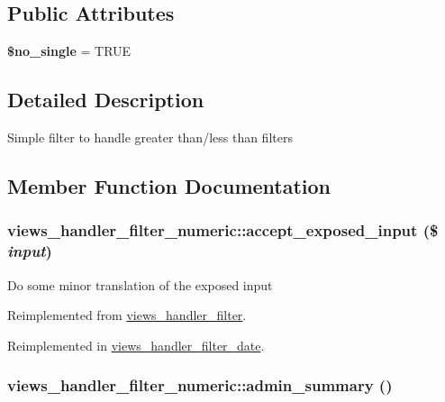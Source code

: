 \subsection*{Public Attributes}
\begin{CompactItemize}
\item 
\hypertarget{classviews__handler__filter__numeric_4707bae1b1cec69dad6f816b9b963fbb}{
\textbf{\$no\_\-single} = TRUE}
\label{classviews__handler__filter__numeric_4707bae1b1cec69dad6f816b9b963fbb}

\end{CompactItemize}


\subsection{Detailed Description}
Simple filter to handle greater than/less than filters 

\subsection{Member Function Documentation}
\hypertarget{classviews__handler__filter__numeric_0fd6abb3062be32410bef3c1cefdaaf5}{
\subsubsection[{accept\_\-exposed\_\-input}]{\setlength{\rightskip}{0pt plus 5cm}views\_\-handler\_\-filter\_\-numeric::accept\_\-exposed\_\-input (\$ {\em input})}}
\label{classviews__handler__filter__numeric_0fd6abb3062be32410bef3c1cefdaaf5}


Do some minor translation of the exposed input 

Reimplemented from \hyperlink{classviews__handler__filter_88ccd2ef359009614abb48fb83c2a738}{views\_\-handler\_\-filter}.

Reimplemented in \hyperlink{classviews__handler__filter__date_063da758bf1832f38454620cbc94e304}{views\_\-handler\_\-filter\_\-date}.\hypertarget{classviews__handler__filter__numeric_aece85d3c36d4186c871cc55e636f4f2}{
\subsubsection[{admin\_\-summary}]{\setlength{\rightskip}{0pt plus 5cm}views\_\-handler\_\-filter\_\-numeric::admin\_\-summary ()}}
\label{classviews__handler__filter__numeric_aece85d3c36d4186c871cc55e636f4f2}


